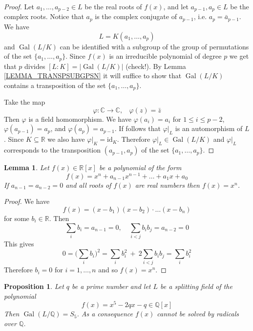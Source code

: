 \documentclass[12pt, letterpaper, oneside]{article}
\theoremstyle{plain}
\newtheorem{lemma}[theorem]{Lemma}
\newtheorem{proposition}[theorem]{Proposition}
\theoremstyle{definition}
\newcommand{\Q}{{\mathbb Q}}
\newcommand{\R}{{\mathbb R}}
\newcommand{\C}{{\mathbb C}}
\newcommand{\id}{\mathrm{id}}
\newcommand{\Gal}{\operatorname{Gal}}
\newcommand{\vs}{\vskip 5mm}
\begin{document}
\begin{proof}
Let $a_{1}, \dots, a_{p-2}\in L$ be the real roots of $f(x)$, and let $a_{p-1}, a_{p}\in L$  
be the complex roots. Notice that $a_{p}$ is the complex conjugate of $a_{p-1}$, 
i.e. $a_{p} = \bar{a}_{p-1}$.  We have 
$$L = K(a_{1}, \dots, a_{p})$$
and $\Gal(L/K)$  can be identified with a subgroup of the group of permutations of the 
set $\{a_{1}, \dots, a_{p}\}$.  Since $f(x)$ is an irreducible polynomial of degree $p$
we get that $p$ divides $[L:K] = |\Gal(L/K)|$ (check!). By Lemma \ref{LEMMA_TRANSPSUBGPSN} 
it will suffice to show that $\Gal(L/K)$ contains a transposition of the set $\{a_{1}, \dots, a_{p}\}$. 

Take the map 
$$\varphi\colon \C \to \C, \ \ \ \ \varphi(z) = \bar{z}$$
Then $\varphi$ is a field homomorphism. We have  $\varphi(a_{i}) = a_{i}$ for $1\leq i \leq p-2$, 
$\varphi(a_{p-1}) = a_{p}$, and $\varphi(a_{p}) = a_{p-1}$.  
If follows that $\varphi|_{L}$ is an automorphism of $L$. Since $K\subseteq \R$ we also have 
$\varphi|_{K} = \id_{K}$. Therefore $\varphi|_{L}\in \Gal(L/K)$ and $\varphi|_{L}$ corresponds to the 
transposition $(a_{p-1}, a_{p})$ of the set $\{a_{1}, \dots, a_{p}\}$. 
\end{proof}

\vs\vs


\begin{lemma}
\label{LEMMA_REALROOTSXN}
Let $f(x)\in \R[x]$ be a polynomial of the form
$$f(x) = x^{n} + a_{n-1}x^{n-1} + \dots + a_{1}x +a_{0}$$
If $a_{n-1}=a_{n-2} =0$ and all roots of $f(x)$ are real numbers then $f(x) = x^{n}$. 
\end{lemma}


\vs

\begin{proof}
We have  
$$f(x) = (x-b_{1})(x-b_{2})\cdot{\dots}(x-b_{n})$$
for some  $b_{i}\in \R$. Then 
$$\sum_{i} b_{i} = a_{n-1} =0, \ \ \ \ \ \sum_{i<j} b_{i}b_{j} = a_{n-2} = 0$$
This gives 
$$0 = \bigg(\sum_{i} b_{i}\bigg)^{2} = \sum_{i} b_{i}^{2} \ +\  2\sum_{i<j} b_{i}b_{j} = \sum_{i}b_{i}^{2}$$
Therefore $b_{i} = 0$ for $i=1, \dots, n$ and so $f(x) = x^{n}$. 
\end{proof}


\vs

\begin{proposition}
\label{PROP_S5QUINTIC}
Let $q$ be a prime number and let $L$ be a splitting field of the polynomial 
$$f(x) = x^{5} - 2qx -q \in \Q[x]$$
Then $\Gal(L/\Q) = S_{5}$. As a consequence $f(x)$ cannot be solved by radicals over $\Q$. 
\end{proposition}
\end{document}
